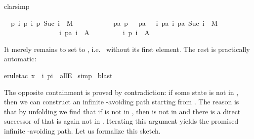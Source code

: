 \begin{isabellebody}
clarsimp{\isacharparenright}%
\begin{isamarkuptxt}%
\begin{isabelle}
\ {}{\isachardot}\ {\isasymAnd}p{\isachardot}\ {\isasymlbrakk}{\isasymforall}i{\isachardot}\ {\isacharparenleft}p\ i{\isacharcomma}\ p\ {\isacharparenleft}Suc\ i{\isacharparenright}{\isacharparenright}\ {\isasymin}\ M{\isacharsemicolon}\isanewline
\ \ \ \ \ \ \ \ \ \ \ {\isasymforall}pa{\isachardot}\ p\ {}\ {\isacharequal}\ pa\ {}\ {\isasymand}\ {\isacharparenleft}{\isasymforall}i{\isachardot}\ {\isacharparenleft}pa\ i{\isacharcomma}\ pa\ {\isacharparenleft}Suc\ i{\isacharparenright}{\isacharparenright}\ {\isasymin}\ M{\isacharparenright}\ {\isasymlongrightarrow}\isanewline
\ \ \ \ \ \ \ \ \ \ \ \ \ \ \ \ {\isacharparenleft}{\isasymexists}i{\isachardot}\ pa\ i\ {\isasymin}\ A{\isacharparenright}{\isasymrbrakk}\isanewline
\ \ \ \ \ \ \ \ {\isasymLongrightarrow}\ {\isasymexists}i{\isachardot}\ p\ i\ {\isasymin}\ A
\end{isabelle}
It merely remains to set  to , i.e.\  without its
first element. The rest is practically automatic:%
\end{isamarkuptxt}%
erule{\isacharunderscore}tac\ x\ {\isacharequal}\ {\isachardoublequote}{\isasymlambda}i{\isachardot}\ p{\isacharparenleft}i{\isacharplus}{}{\isacharparenright}{\isachardoublequote}\ \ allE{\isacharparenright}\isanewline
{}\ simp\isanewline
{}\ blast\isanewline
{}%
\begin{isamarkuptext}%
The opposite containment is proved by contradiction: if some state
 is not in , then we can construct an
infinite -avoiding path starting from . The reason is
that by unfolding  we find that if  is not in
, then  is not in  and there is a
direct successor of  that is again not in . Iterating this argument yields the promised infinite
-avoiding path. Let us formalize this sketch.


\end{isamarkuptext}
\end{isabellebody}
